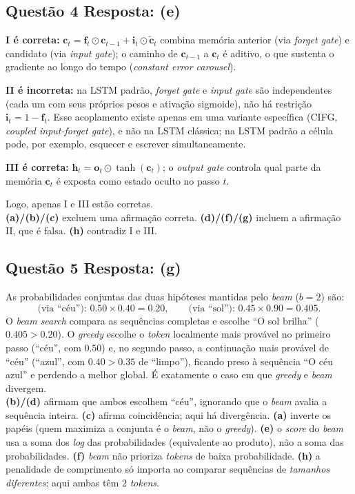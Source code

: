 \documentclass[11pt,a4paper]{article}
\begin{document}
\subsection*{Questão 4 \textemdash{} Resposta: (e)}
\textbf{I é correta:} $\mathbf{c}_t = \mathbf{f}_t \odot \mathbf{c}_{t-1} + \mathbf{i}_t \odot \tilde{\mathbf{c}}_t$ combina memória anterior (via \textit{forget gate}) e candidato (via \textit{input gate}); o caminho de $\mathbf{c}_{t-1}$ a $\mathbf{c}_t$ é aditivo, o que sustenta o gradiente ao longo do tempo (\textit{constant error carousel}).

\textbf{II é incorreta:} na LSTM padrão, \textit{forget gate} e \textit{input gate} são independentes (cada um com seus próprios pesos e ativação sigmoide), não há restrição $\mathbf{i}_t = 1 - \mathbf{f}_t$. Esse acoplamento existe apenas em uma variante específica (CIFG, \textit{coupled input-forget gate}), e não na LSTM clássica; na LSTM padrão a célula pode, por exemplo, esquecer e escrever simultaneamente.

\textbf{III é correta:} $\mathbf{h}_t = \mathbf{o}_t \odot \tanh(\mathbf{c}_t)$; o \textit{output gate} controla qual parte da memória $\mathbf{c}_t$ é exposta como estado oculto no passo $t$.

Logo, apenas I e III estão corretas.\\
\textbf{(a)/(b)/(c)} excluem uma afirmação correta.
\textbf{(d)/(f)/(g)} incluem a afirmação II, que é falsa.
\textbf{(h)} contradiz I e III.

\subsection*{Questão 5 \textemdash{} Resposta: (g)}
As probabilidades conjuntas das duas hipóteses mantidas pelo \textit{beam} ($b=2$) são:
\[
\text{(via ``céu''): } 0.50 \times 0.40 = 0.20, \qquad
\text{(via ``sol''): } 0.45 \times 0.90 = 0.405.
\]
O \textit{beam search} compara as sequências completas e escolhe ``O sol brilha'' ($0.405 > 0.20$). O \textit{greedy} escolhe o \textit{token} localmente mais provável no primeiro passo (``céu'', com $0.50$) e, no segundo passo, a continuação mais provável de ``céu'' (``azul'', com $0.40 > 0.35$ de ``limpo''), ficando preso à sequência ``O céu azul'' e perdendo a melhor global. É exatamente o caso em que \textit{greedy} e \textit{beam} divergem.\\
\textbf{(b)/(d)} afirmam que ambos escolhem ``céu'', ignorando que o \textit{beam} avalia a sequência inteira.
\textbf{(c)} afirma coincidência; aqui há divergência.
\textbf{(a)} inverte os papéis (quem maximiza a conjunta é o \textit{beam}, não o \textit{greedy}).
\textbf{(e)} o \textit{score} do \textit{beam} usa a soma dos \emph{log} das probabilidades (equivalente ao produto), não a soma das probabilidades.
\textbf{(f)} \textit{beam} não prioriza \textit{tokens} de baixa probabilidade.
\textbf{(h)} a penalidade de comprimento só importa ao comparar sequências de \emph{tamanhos diferentes}; aqui ambas têm $2$ \textit{tokens}.
\end{document}
